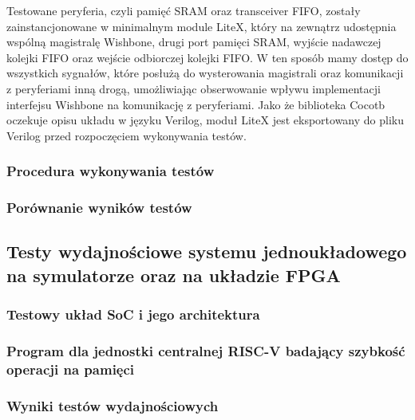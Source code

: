 Testowane peryferia, czyli pamięć SRAM oraz transceiver FIFO, zostały zainstancjonowane w minimalnym module LiteX, który na zewnątrz udostępnia wspólną magistralę Wishbone, drugi port pamięci SRAM, wyjście nadawczej kolejki FIFO oraz wejście odbiorczej kolejki FIFO. W ten sposób mamy dostęp do wszystkich sygnałów, które posłużą do wysterowania magistrali oraz komunikacji z peryferiami inną drogą, umożliwiając obserwowanie wpływu implementacji interfejsu Wishbone na komunikację z peryferiami. Jako że biblioteka Cocotb oczekuje opisu układu w języku Verilog, moduł LiteX jest eksportowany do pliku Verilog przed rozpoczęciem wykonywania testów.


\subsubsection{Procedura wykonywania testów}

\subsubsection{Porównanie wyników testów}

\subsection{Testy wydajnościowe systemu jednoukładowego na symulatorze oraz na układzie FPGA}

\subsubsection{Testowy układ SoC i jego architektura}

\subsubsection{Program dla jednostki centralnej RISC-V badający szybkość operacji na pamięci}

\subsubsection{Wyniki testów wydajnościowych}

